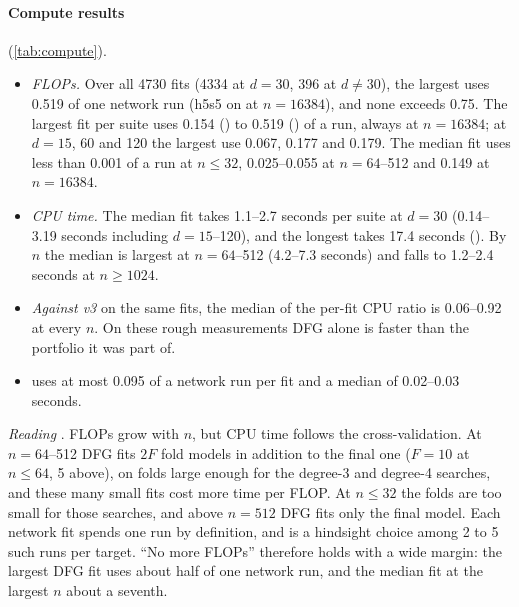 \paragraph{Compute results}  (\cref{tab:compute}).
\begin{itemize}
\item \emph{FLOPs.} Over all 4730 fits (4334 at $d=30$, 396 at $d\ne30$), the largest uses 0.519 of one network run (h5s5 on  at $n=16384$), and none exceeds 0.75. The largest fit per suite uses 0.154 () to 0.519 () of a run, always at $n=16384$; at $d=15$, 60 and 120 the largest use 0.067, 0.177 and 0.179. The median fit uses less than 0.001 of a run at $n\le32$, 0.025--0.055 at $n=64$--512 and 0.149 at $n=16384$.
\item \emph{CPU time.} The median fit takes 1.1--2.7 seconds per suite at $d=30$ (0.14--3.19 seconds including $d=15$--120), and the longest takes 17.4 seconds (). By $n$ the median is largest at $n=64$--512 (4.2--7.3 seconds) and falls to 1.2--2.4 seconds at $n\ge1024$.
\item \emph{Against v3} on the same fits, the median of the per-fit CPU ratio is 0.06--0.92 at every $n$. On these rough measurements DFG alone is faster than the portfolio it was part of.
\item \emph{} uses at most 0.095 of a network run per fit and a median of 0.02--0.03 seconds.
\end{itemize}
\emph{Reading} . FLOPs grow with $n$, but CPU time follows the cross-validation. At $n=64$--512 DFG fits $2F$ fold models in addition to the final one ($F=10$ at $n\le64$, 5 above), on folds large enough for the degree-3 and degree-4 searches, and these many small fits cost more time per FLOP. At $n\le32$ the folds are too small for those searches, and above $n=512$ DFG fits only the final model. Each network fit spends one run by definition, and  is a hindsight choice among 2 to 5 such runs per target. ``No more FLOPs'' therefore holds with a wide margin: the largest DFG fit uses about half of one network run, and the median fit at the largest $n$ about a seventh.

